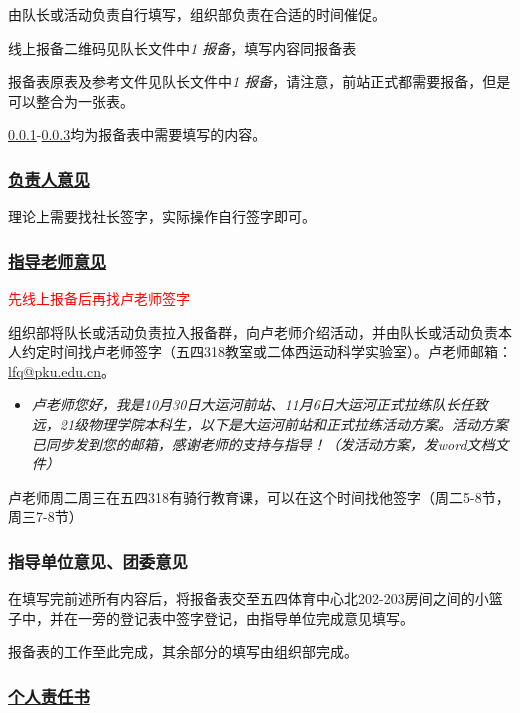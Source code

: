\documentclass[UTF8]{ctexart}
\begin{document}
由队长或活动负责自行填写，组织部负责在合适的时间催促。

线上报备二维码见队长文件中{\color{blue}\textit{1 报备}}，填写内容同报备表

报备表原表及参考文件见队长文件中{\color{blue}\textit{1 报备}}，请注意，前站正式都需要报备，但是可以整合为一张表。

\ref{起始}-\ref{结束}均为报备表中需要填写的内容。

\subsubsection[负责人意见]{\underline{负责人意见}}\label{起始}

理论上需要找社长签字，实际操作自行签字即可。

\subsubsection[指导老师意见]{\underline{指导老师意见}}

\textcolor{red}{先线上报备后再找卢老师签字}

组织部将队长或活动负责拉入报备群，向卢老师介绍活动，并由队长或活动负责本人约定时间找卢老师签字（五四318教室或二体西运动科学实验室）。卢老师邮箱：\href{mailto:lfq@pku.edu.cn}{lfq@pku.edu.cn}。

\begin{itemize}[nosep]
    \item[] \textit{卢老师您好，我是10月30日大运河前站、11月6日大运河正式拉练队长任致远，21级物理学院本科生，以下是大运河前站和正式拉练活动方案。活动方案已同步发到您的邮箱，感谢老师的支持与指导！（发活动方案，发word文档文件）}
\end{itemize}

卢老师周二周三在五四318有骑行教育课，可以在这个时间找他签字（周二5-8节，周三7-8节）


\subsubsection{指导单位意见、团委意见}\label{结束}

在填写完前述所有内容后，将报备表交至五四体育中心北202-203房间之间的小篮子中，并在一旁的登记表中签字登记，由指导单位完成意见填写。

报备表的工作至此完成，其余部分的填写由组织部完成。

\subsubsection[个人责任书]{\underline{个人责任书}}
\end{document}
